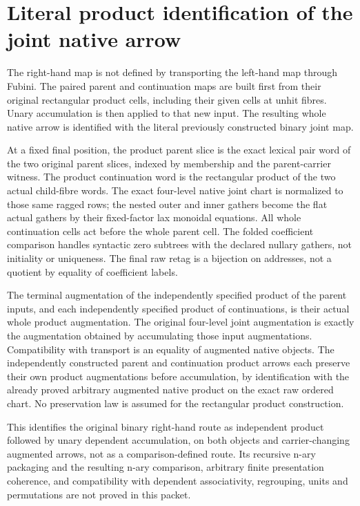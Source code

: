\documentclass{article}
\begin{document}
\section*{Literal product identification of the joint native arrow}
The right-hand map is not defined by transporting the left-hand map
through Fubini. The paired parent and continuation maps are built
first from their original rectangular product cells, including their
given cells at unhit fibres. Unary accumulation is then applied to
that new input. The resulting whole native arrow is identified with
the literal previously constructed binary joint map.

At a fixed final position, the product parent slice is the exact
lexical pair word of the two original parent slices, indexed by
membership and the parent-carrier witness. The product continuation
word is the rectangular product of the two actual child-fibre words.
The exact four-level native joint chart is normalized to those same
ragged rows; the nested outer and inner gathers become the flat
actual gathers by their fixed-factor lax monoidal equations.
All whole continuation cells act before the whole parent cell.
The folded coefficient comparison handles syntactic zero subtrees
with the declared nullary gathers, not initiality or uniqueness.
The final raw retag is a bijection on addresses, not a quotient
by equality of coefficient labels.

The terminal augmentation of the independently specified product
of the parent inputs, and each independently specified product of
continuations, is their actual whole product augmentation. The
original four-level joint augmentation is exactly the augmentation
obtained by accumulating those input augmentations. Compatibility
with transport is an equality of augmented native objects. The
independently constructed parent and continuation product arrows
each preserve their own product augmentations before accumulation,
by identification with the already proved arbitrary augmented
native product on the exact raw ordered chart. No preservation law
is assumed for the rectangular product construction.

This identifies the original binary right-hand route as independent
product followed by unary dependent accumulation, on both objects
and carrier-changing augmented arrows, not as a comparison-defined
route. Its recursive n-ary packaging and the resulting n-ary
comparison, arbitrary finite presentation coherence, and
compatibility with dependent associativity, regrouping, units and
permutations are not proved in this packet.
\end{document}
